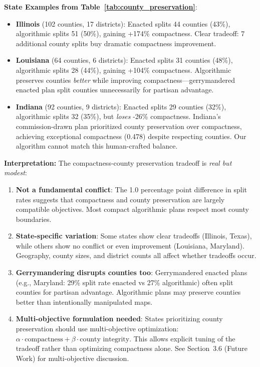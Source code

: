 \textbf{State Examples from Table~\ref{tab:county_preservation}}:
\begin{itemize}
    \item \textbf{Illinois} (102 counties, 17 districts): Enacted splits 44 counties (43\%), algorithmic splits 51 (50\%), gaining +174\% compactness. Clear tradeoff: 7 additional county splits buy dramatic compactness improvement.

    \item \textbf{Louisiana} (64 counties, 6 districts): Enacted splits 31 counties (48\%), algorithmic splits 28 (44\%), gaining +104\% compactness. Algorithmic preserves counties \textit{better} while improving compactness—gerrymandered enacted plan split counties unnecessarily for partisan advantage.

    \item \textbf{Indiana} (92 counties, 9 districts): Enacted splits 29 counties (32\%), algorithmic splits 32 (35\%), but \textit{loses} -26\% compactness. Indiana's commission-drawn plan prioritized county preservation over compactness, achieving exceptional compactness (0.478) despite respecting counties. Our algorithm cannot match this human-crafted balance.
\end{itemize}

\textbf{Interpretation:} The compactness-county preservation tradeoff is \textit{real but modest}:

\begin{enumerate}
    \item \textbf{Not a fundamental conflict}: The 1.0 percentage point difference in split rates suggests that compactness and county preservation are largely compatible objectives. Most compact algorithmic plans respect most county boundaries.

    \item \textbf{State-specific variation}: Some states show clear tradeoffs (Illinois, Texas), while others show no conflict or even improvement (Louisiana, Maryland). Geography, county sizes, and district counts all affect whether tradeoffs occur.

    \item \textbf{Gerrymandering disrupts counties too}: Gerrymandered enacted plans (e.g., Maryland: 29\% split rate enacted vs 27\% algorithmic) often split counties for partisan advantage. Algorithmic plans may preserve counties better than intentionally manipulated maps.

    \item \textbf{Multi-objective formulation needed}: States prioritizing county preservation should use multi-objective optimization: $\alpha \cdot \text{compactness} + \beta \cdot \text{county integrity}$. This allows explicit tuning of the tradeoff rather than optimizing compactness alone. See Section~3.6 (Future Work) for multi-objective discussion.
\end{enumerate}

